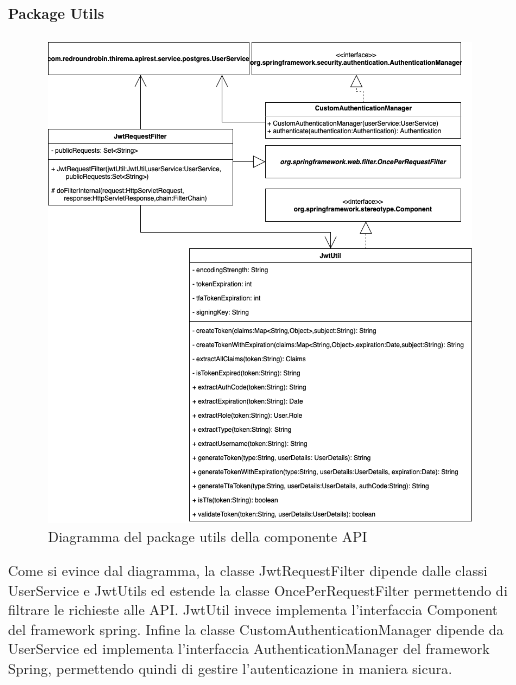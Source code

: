 		\paragraph*{Package Utils}		
		\begin{figure}[H]
			\centering
			\includegraphics[scale=0.550]{res/images/API/UtilsPackage.png}
			\caption{Diagramma del package utils della componente API}
			\label{Diagramma 11}
		\end{figure}
		Come si evince dal diagramma, la classe JwtRequestFilter dipende dalle classi UserService e JwtUtils ed estende la classe OncePerRequestFilter permettendo di filtrare le richieste alle API. JwtUtil invece implementa l'interfaccia Component del framework spring. Infine la classe CustomAuthenticationManager dipende da UserService ed implementa l'interfaccia AuthenticationManager del framework Spring, permettendo quindi di gestire l'autenticazione in maniera sicura.
